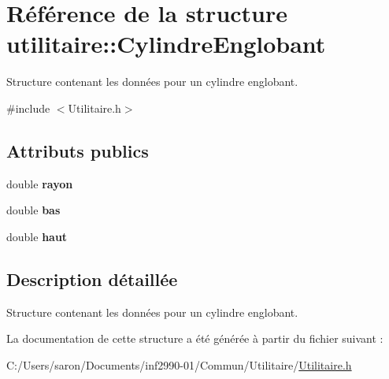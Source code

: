 \hypertarget{structutilitaire_1_1_cylindre_englobant}{\section{Référence de la structure utilitaire\-:\-:Cylindre\-Englobant}
\label{structutilitaire_1_1_cylindre_englobant}
}


Structure contenant les données pour un cylindre englobant.  




{\ttfamily \#include $<$Utilitaire.\-h$>$}

\subsection*{Attributs publics}
\begin{DoxyCompactItemize}
\item 
\hypertarget{structutilitaire_1_1_cylindre_englobant_abbec6b7a8f2790f286317ffcdeab476c}{double {\bfseries rayon}}\label{structutilitaire_1_1_cylindre_englobant_abbec6b7a8f2790f286317ffcdeab476c}

\item 
\hypertarget{structutilitaire_1_1_cylindre_englobant_ac99c3cebbc6829ad9f54e392f4525e7e}{double {\bfseries bas}}\label{structutilitaire_1_1_cylindre_englobant_ac99c3cebbc6829ad9f54e392f4525e7e}

\item 
\hypertarget{structutilitaire_1_1_cylindre_englobant_a9f86204ad37c5b04fb329b710304c459}{double {\bfseries haut}}\label{structutilitaire_1_1_cylindre_englobant_a9f86204ad37c5b04fb329b710304c459}

\end{DoxyCompactItemize}


\subsection{Description détaillée}
Structure contenant les données pour un cylindre englobant. 

La documentation de cette structure a été générée à partir du fichier suivant \-:\begin{DoxyCompactItemize}
\item 
C\-:/\-Users/saron/\-Documents/inf2990-\/01/\-Commun/\-Utilitaire/\hyperlink{_utilitaire_8h}{Utilitaire.\-h}\end{DoxyCompactItemize}
